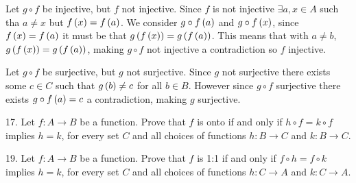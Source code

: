 \begin{mdframed}[style=darkAnswer,frametitle={Joe Starr}]
Let $g\circ f$ be injective, but $f$ not injective. Since $f$ is not injective
$\exists a,x\in A$ such tha $a\neq x$ but $f\left(x\right)=f\left(a\right)$. We consider 
$g\circ f\left(a\right)$ and $g\circ f\left(x\right)$, since $f\left(x\right)=f\left(a\right)$ it must be that
$g\left(f\left(x\right)\right)=g\left(f\left(a\right)\right)$. This means that with $a\neq b$, 
$g\left(f\left(x\right)\right)=g\left(f\left(a\right)\right)$, making $g\circ f$ not injective a contradiction 
so $f$ injective. 

Let $g\circ f$ be surjective, but $g$ not surjective. Since $g$ not surjective
there exists some $c\in C$ such that $g\left(b\right)\neq c$ for all $b\in B$. However 
since $g\circ f$ surjective there exists $g\circ f\left(a\right)=c$ a contradiction, 
making $g$ surjective. 
\end{mdframed}
\newpage
\begin{mdframed}[style=darkQuesion]
  17. Let $f:A\to B$ be a function. Prove that $f$ is onto if and only if 
  $h\circ f = k \circ f$ implies $h=k$, for every set $C$ and all choices of 
  functions $h:B\to C$ and $k:B\to C$.
\end{mdframed}

\begin{mdframed}[style=darkAnswer,frametitle={Joe Starr}]

\end{mdframed}
\newpage
\begin{mdframed}[style=darkQuesion]
  19. Let $f:A\to B$ be a function. Prove that $f$ is 1:1 if and only if 
  $f\circ h=f\circ k$ implies $h=k$, for every set $C$ and all choices of 
  functions $h:C\to A$ and $k:C\to A$.
\end{mdframed}
  
